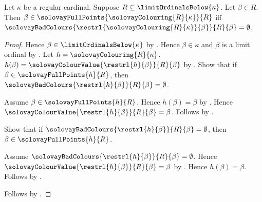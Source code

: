 \begin{theorem}\label{solovay_full_point_iff_no_bad_colours}
    Let $\kappa$ be a regular cardinal.
    Suppose $R\subseteq\limitOrdinalsBelow{\kappa}$.
    Let $\beta\in R$.
    Then $\beta\in\solovayFullPoints{\solovayColouring{R}{\kappa}}{R}$
        iff $\solovayBadColours
            {\restrl{\solovayColouring{R}{\kappa}}{\beta}}{R}{\beta}
                =\emptyset$.
\end{theorem}
\begin{proof}
    Hence $\beta\in\limitOrdinalsBelow{\kappa}$ by .
    Hence $\beta\in\kappa$ and $\beta$ is a limit ordinal
        by .
    Let $h=\solovayColouring{R}{\kappa}$.
    $h(\beta)=\solovayColourValue{\restrl{h}{\beta}}{R}{\beta}$
        by .
    Show that if $\beta\in\solovayFullPoints{h}{R}$, then
        $\solovayBadColours{\restrl{h}{\beta}}{R}{\beta}=\emptyset$.
    \begin{subproof}
        Assume $\beta\in\solovayFullPoints{h}{R}$.
        Hence $h(\beta)=\beta$ by .
        Hence $\solovayColourValue{\restrl{h}{\beta}}{R}{\beta}=\beta$.
        Follows by .
    \end{subproof}
    Show that if
        $\solovayBadColours{\restrl{h}{\beta}}{R}{\beta}=\emptyset$, then
        $\beta\in\solovayFullPoints{h}{R}$.
    \begin{subproof}
        Assume $\solovayBadColours{\restrl{h}{\beta}}{R}{\beta}=\emptyset$.
        Hence $\solovayColourValue{\restrl{h}{\beta}}{R}{\beta}=\beta$
            by .
        Hence $h(\beta)=\beta$.
        Follows by .
    \end{subproof}
    Follows by \auto.
\end{proof}

